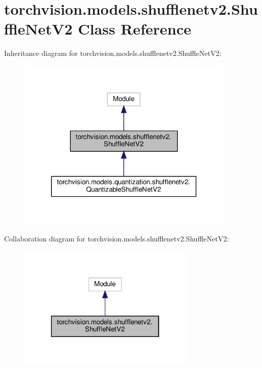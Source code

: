 \hypertarget{classtorchvision_1_1models_1_1shufflenetv2_1_1ShuffleNetV2}{}\section{torchvision.\+models.\+shufflenetv2.\+Shuffle\+Net\+V2 Class Reference}
\label{classtorchvision_1_1models_1_1shufflenetv2_1_1ShuffleNetV2}


Inheritance diagram for torchvision.\+models.\+shufflenetv2.\+Shuffle\+Net\+V2\+:
\nopagebreak
\begin{figure}[H]
\begin{center}
\leavevmode
\includegraphics[width=293pt]{classtorchvision_1_1models_1_1shufflenetv2_1_1ShuffleNetV2__inherit__graph}
\end{center}
\end{figure}


Collaboration diagram for torchvision.\+models.\+shufflenetv2.\+Shuffle\+Net\+V2\+:
\nopagebreak
\begin{figure}[H]
\begin{center}
\leavevmode
\includegraphics[width=238pt]{classtorchvision_1_1models_1_1shufflenetv2_1_1ShuffleNetV2__coll__graph}
\end{center}
\end{figure}
